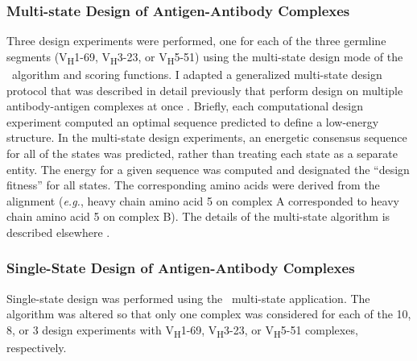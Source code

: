 \subsubsection{Multi-state Design of Antigen-Antibody Complexes}
Three design experiments were performed, one for each of the three germline segments (V\textsubscript{H}1-69, V\textsubscript{H}3-23, or V\textsubscript{H}5-51) using the multi-state design mode of the \rosetta~algorithm and scoring functions. I adapted a generalized multi-state design protocol that was described in detail previously that perform design on multiple antibody-antigen complexes at once \citep{LeaverFay:2011ji}. Briefly, each computational design experiment computed an optimal sequence predicted to define a low-energy structure.  In the multi-state design experiments, an energetic consensus sequence for all of the states was predicted, rather than treating each state as a separate entity. The energy for a given sequence was computed and designated the ``design fitness'' for all states. The corresponding amino acids were derived from the alignment (\textit{e.g.}, heavy chain amino acid 5 on complex A corresponded to heavy chain amino acid 5 on complex B). The details of the multi-state algorithm is described elsewhere \citep{LeaverFay:2011ji}.

\subsubsection{Single-State Design of Antigen-Antibody Complexes}
Single-state design was performed using the \rosetta~multi-state application. The algorithm was altered so that only one complex was considered for each of the 10, 8, or 3 design experiments with V\textsubscript{H}1-69, V\textsubscript{H}3-23, or V\textsubscript{H}5-51 complexes, respectively.


